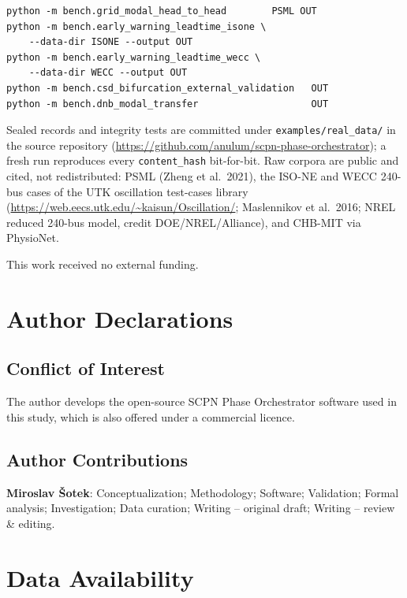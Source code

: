 \documentclass[aip,cha,preprint,amsmath,amssymb]{revtex4-2}
\newcommand{\code}[1]{\texttt{#1}}
\begin{document}
{\scriptsize\begin{verbatim}
python -m bench.grid_modal_head_to_head        PSML OUT
python -m bench.early_warning_leadtime_isone \
    --data-dir ISONE --output OUT
python -m bench.early_warning_leadtime_wecc \
    --data-dir WECC --output OUT
python -m bench.csd_bifurcation_external_validation   OUT
python -m bench.dnb_modal_transfer                    OUT
\end{verbatim}}

Sealed records and integrity tests are committed under
\code{examples/real\_data/} in the source repository
(\url{https://github.com/anulum/scpn-phase-orchestrator}); a fresh run
reproduces every \code{content\_hash} bit-for-bit. Raw corpora are
public and cited, not redistributed: PSML (Zheng et al.\ 2021), the
ISO-NE and WECC 240-bus cases of the UTK oscillation test-cases library
(\url{https://web.eecs.utk.edu/~kaisun/Oscillation/}; Maslennikov et
al.\ 2016; NREL reduced 240-bus model, credit DOE/NREL/Alliance), and
CHB-MIT via PhysioNet.

\begin{acknowledgments}
This work received no external funding.
\end{acknowledgments}

\section*{Author Declarations}

\subsection*{Conflict of Interest}

The author develops the open-source SCPN Phase Orchestrator software
used in this study, which is also offered under a commercial licence.

\subsection*{Author Contributions}

\textbf{Miroslav \v{S}otek}: Conceptualization; Methodology; Software;
Validation; Formal analysis; Investigation; Data curation;
Writing -- original draft; Writing -- review \& editing.

\section*{Data Availability}
\end{document}
